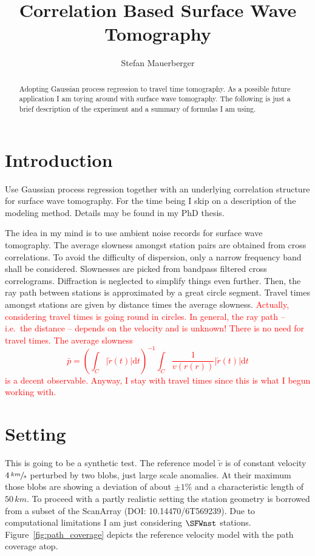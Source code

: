 \documentclass[11pt]{article}
\title{Correlation Based Surface Wave Tomography}
\author{Stefan Mauerberger}
\newcommand\worries[1]{\textcolor{red}{#1}}
\begin{document}
\maketitle
\begin{abstract}
    Adopting Gaussian process regression to travel time tomography.
    As a possible future application I am toying around with surface wave tomography.
    The following is just a brief description of the experiment and a summary of formulas I am using.
\end{abstract}

\section{Introduction}


Use Gaussian process regression together with an underlying correlation structure for surface wave tomography.
For the time being I skip on a description of the modeling method.
Details may be found in my PhD thesis.

The idea in my mind is to use ambient noise records for surface wave tomography.
The average slowness amongst station pairs are obtained from cross correlations.
To avoid the difficulty of dispersion, only a narrow frequency band shall be considered.
Slownesses are picked from bandpass filtered cross correlograms.
Diffraction is neglected to simplify things even further.
Then, the ray path between stations is approximated by a great circle segment.
Travel times amongst stations are given by distance times the average slowness.
\worries{Actually, considering travel times is going round in circles.
In general, the ray path -- i.e.~the distance -- depends on the velocity and is unknown!
There is no need for travel times.
The average slowness
\begin{equation}
    \bar p = \left(\int_C |\acute r(t)| \mathrm d t \right)^{-1} \int_C \frac 1 {v(r(r))} |\acute r(t)| \mathrm d t
\end{equation}
is a decent observable.
Anyway, I stay with travel times since this is what I begun working with.}

\section{Setting}

This is going to be a synthetic test.
The reference model $\tilde v$ is of constant velocity $4\,\sfrac{km}s$ perturbed by two blobs, just large scale anomalies.
At their maximum those blobs are showing a deviation of about $\pm 1\%$ and a characteristic length of $50\,km$.
To proceed with a partly realistic setting the station geometry is borrowed from a subset of the ScanArray (DOI: 10.14470/6T569239).
Due to computational limitations I am just considering $\SFWnst$ stations.
Figure~\ref{fig:path_coverage} depicts the reference velocity model with the path coverage atop.
\end{document}
